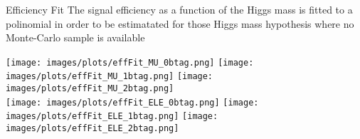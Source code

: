 













\begin{frame}{Efficiency Fit}
The signal efficiency as a function of the Higgs mass is fitted to a polinomial in order to be estimatated for those Higgs mass hypothesis where no Monte-Carlo sample is available
\begin{center}
\texttt{[image: images/plots/effFit\_MU\_0btag.png]}
\texttt{[image: images/plots/effFit\_MU\_1btag.png]}
\texttt{[image: images/plots/effFit\_MU\_2btag.png]}
\\

\texttt{[image: images/plots/effFit\_ELE\_0btag.png]}
\texttt{[image: images/plots/effFit\_ELE\_1btag.png]}
\texttt{[image: images/plots/effFit\_ELE\_2btag.png]}





\end{center}
\end{frame}




